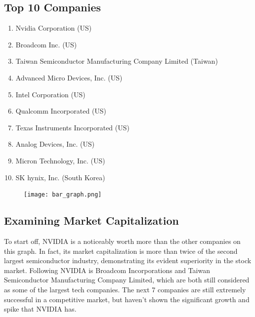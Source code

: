 \documentclass[article, 9pt]{extarticle}
\begin{document}
\begin{minipage}[t]{0.4\textwidth}

\subsection{Top 10 Companies}

    \begin{enumerate}
        \item Nvidia Corporation (US)
        \item Broadcom Inc. (US)
        \item Taiwan Semiconductor Manufacturing Company Limited (Taiwan)
        \item Advanced Micro Devices, Inc. (US)
        \item Intel Corporation (US)
        \item Qualcomm Incorporated (US)
        \item Texas Instruments Incorporated (US)
        \item Analog Devices, Inc. (US)
        \item Micron Technology, Inc. (US)
        \item SK hynix, Inc. (South Korea)
    \end{enumerate}
\end{minipage}
\hfill
\begin{minipage}[t]{0.6\textwidth}
\centering
    \begin{figure}[H]
        \centering
        \texttt{[image: bar\_graph.png]}
    \end{figure}
\end{minipage}




\subsection{Examining Market Capitalization}

To start off, NVIDIA is a noticeably worth more than the other companies on this graph. In fact, its market capitalization is more than twice of the second largest semiconductor industry, demonstrating its evident superiority in the stock market. Following NVIDIA is Broadcom Incorporations and Taiwan Semiconductor Manufacturing Company Limited, which are both still considered as some of the largest tech companies. The next 7 companies are still extremely successful in a competitive market, but haven't shown the significant growth and spike that NVIDIA has.
\end{document}
